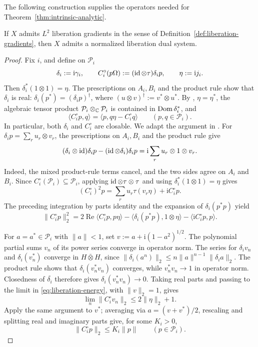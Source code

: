 The following construction supplies the operators needed for Theorem~\ref{thm:intrinsic-analytic}.
\begin{lemma}\label{lem:gradient-liberation}
If $X$ admits $L^2$ liberation gradients in the sense of Definition~\ref{def:liberation-gradients}, then $X$ admits a normalized liberation dual system.
\end{lemma}
\begin{proof}
Fix $i$, and define on $\mathcal P_i$
\[
 \delta_i:=\mathrm i\gamma_i,\qquad
 C_i^\circ(p\Omega):=(\operatorname{id}\otimes\tau)\delta_ip,\qquad
 \eta:=\mathrm i j_i.
\]
Then $\delta_i^*(1\otimes1)=\eta$.
The prescriptions on $A_i,B_i$ and the product rule show that $\delta_i$ is real:
$\delta_i(p^*)=(\delta_ip)^\dagger$, where $(u\otimes v)^\dagger:=v^*\otimes u^*$.
By \cite[Lemmas~4.6--4.7]{Mai15}, $\eta=\eta^*$, the algebraic tensor product $\mathcal P_i\otimes_{\mathbb C}\mathcal P_i$ is contained in $\operatorname{Dom}\delta_i^*$, and
\[
 \langle C_i^\circ p,q\rangle=\langle p,q\eta-C_i^\circ q\rangle
 \qquad(p,q\in\mathcal P_i).
\]
In particular, both $\delta_i$ and $C_i^\circ$ are closable.
We adapt the argument in \cite[proof of Lemma~12]{Dab10}.
For $\delta_i p=\sum_r u_r\otimes v_r$, the prescriptions on $A_i,B_i$ and the product rule give
\[
 (\delta_i\otimes\operatorname{id})\delta_i p-(\operatorname{id}\otimes\delta_i)\delta_i p
 =\mathrm i\sum_r u_r\otimes1\otimes v_r.
\]
Indeed, the mixed product-rule terms cancel, and the two sides agree on $A_i$ and $B_i$.
Since $C_i^\circ(\mathcal P_i)\subseteq\mathcal P_i$, applying $\operatorname{id}\otimes\tau\otimes\tau$ and using $\delta_i^*(1\otimes1)=\eta$ gives
\[
 (C_i^\circ)^2p=\sum_r u_r\tau(v_r\eta)+\mathrm iC_i^\circ p.
\]
The preceding integration by parts identity and the expansion of $\delta_i(p^*p)$ yield
\begin{equation}\label{eq:liberation-energy}
 \|C_i^\circ p\|_2^2
 =2\operatorname{Re}\langle C_i^\circ p,p\eta\rangle
  -\langle\delta_i(p^*p),1\otimes\eta\rangle
  -\langle\mathrm iC_i^\circ p,p\rangle.
\end{equation}

For $a=a^*\in\mathcal P_i$ with $\|a\|<1$, set $v:=a+\mathrm i(1-a^2)^{1/2}$.
The polynomial partial sums $v_n$ of its power series converge in operator norm.
The series for $\delta_i v_n$ and $\delta_i(v_n^*)$ converge in $H\bar\otimes H$, since $\|\delta_i(a^n)\|_2\leq n\|a\|^{n-1}\|\delta_i a\|_2$.
The product rule shows that $\delta_i(v_n^*v_n)$ converges, while $v_n^*v_n\to1$ in operator norm.
Closedness of $\overline{\delta_i}$ therefore gives $\delta_i(v_n^*v_n)\to0$.
Taking real parts and passing to the limit in \eqref{eq:liberation-energy}, with $\|v\|_2=1$, gives
\[
 \lim_n\|C_i^\circ v_n\|_2\leq2\|\eta\|_2+1.
\]
Apply the same argument to $v^*$; averaging via $a=(v+v^*)/2$, rescaling and splitting real and imaginary parts give, for some $K_i>0$,
\[
 \|C_i^\circ p\|_2\leq K_i\|p\|\qquad(p\in\mathcal P_i).
\]


\end{proof}
